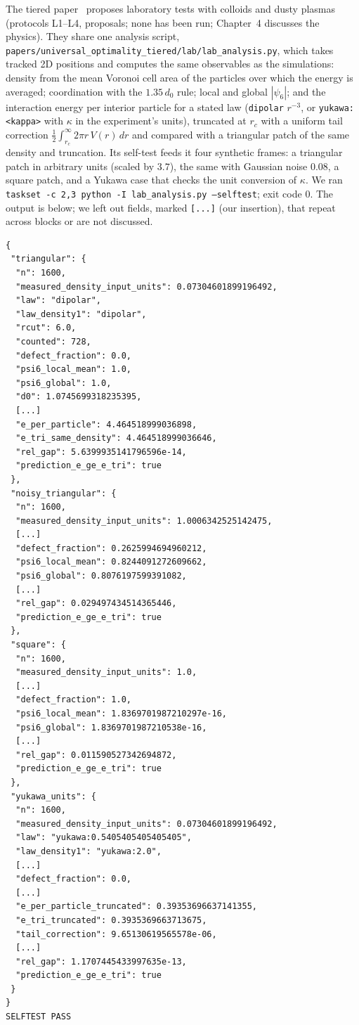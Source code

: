 The tiered paper~\cite{tiered} proposes laboratory tests with colloids and dusty plasmas (protocols L1--L4, \tierC{}
proposals; none has been run; Chapter~4 discusses the physics). They share
one analysis script, \texttt{papers/\allowbreak universal\_\allowbreak optimality\_\allowbreak tiered/\allowbreak lab/\allowbreak lab\_analysis.py}, which takes tracked 2D
positions and computes the same observables as the simulations: density from the mean Voronoi cell area of the
particles over which the energy is averaged; coordination with the $1.35\,d_0$ rule; local and global $|\psi_6|$; and the
interaction energy per interior particle for a stated law (\texttt{dipolar} $r^{-3}$, or \texttt{yukawa:<kappa>} with
$\kappa$ in the experiment's units), truncated at $r_c$ with a uniform tail correction
$\frac12\int_{r_c}^\infty2\pi r\,V(r)\,dr$ and compared with a triangular patch of the same density and truncation. Its
self-test feeds it four synthetic frames: a triangular patch in arbitrary units (scaled by $3.7$), the same with Gaussian
noise $0.08$, a square patch, and a Yukawa case that checks the unit conversion of $\kappa$. We ran
\texttt{taskset -c 2,3 python -I lab\_analysis.py --selftest}; exit code 0. The output is below; we left out fields,
marked \texttt{[...]} (our insertion), that repeat across blocks or are not discussed.
\begin{lstlisting}[language={},basicstyle=\ttfamily\scriptsize,title={lab\_analysis.py --selftest}]
{
 "triangular": {
  "n": 1600,
  "measured_density_input_units": 0.07304601899196492,
  "law": "dipolar",
  "law_density1": "dipolar",
  "rcut": 6.0,
  "counted": 728,
  "defect_fraction": 0.0,
  "psi6_local_mean": 1.0,
  "psi6_global": 1.0,
  "d0": 1.0745699318235395,
  [...]
  "e_per_particle": 4.464518999036898,
  "e_tri_same_density": 4.464518999036646,
  "rel_gap": 5.6399935141796596e-14,
  "prediction_e_ge_e_tri": true
 },
 "noisy_triangular": {
  "n": 1600,
  "measured_density_input_units": 1.0006342525142475,
  [...]
  "defect_fraction": 0.2625994694960212,
  "psi6_local_mean": 0.8244091272609662,
  "psi6_global": 0.8076197599391082,
  [...]
  "rel_gap": 0.029497434514365446,
  "prediction_e_ge_e_tri": true
 },
 "square": {
  "n": 1600,
  "measured_density_input_units": 1.0,
  [...]
  "defect_fraction": 1.0,
  "psi6_local_mean": 1.8369701987210297e-16,
  "psi6_global": 1.8369701987210538e-16,
  [...]
  "rel_gap": 0.011590527342694872,
  "prediction_e_ge_e_tri": true
 },
 "yukawa_units": {
  "n": 1600,
  "measured_density_input_units": 0.07304601899196492,
  "law": "yukawa:0.5405405405405405",
  "law_density1": "yukawa:2.0",
  [...]
  "defect_fraction": 0.0,
  [...]
  "e_per_particle_truncated": 0.39353696637141355,
  "e_tri_truncated": 0.3935369663713675,
  "tail_correction": 9.65130619565578e-06,
  [...]
  "rel_gap": 1.1707445433997635e-13,
  "prediction_e_ge_e_tri": true
 }
}
SELFTEST PASS
\end{lstlisting}
